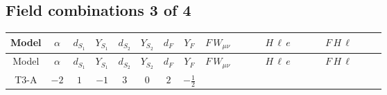 \documentclass[8pt]{article}
\begin{document}
\begin{landscape}
\subsection*{Field combinations 3 of 4}
\begin{longtable}{@{}cccccccc >{\raggedright\arraybackslash}p{0.21\linewidth} >{\raggedright\arraybackslash}p{0.21\linewidth} >{\raggedright\arraybackslash}p{0.21\linewidth}@{}}
\toprule
Model & $\alpha$ & $d_{S_1}$ & $Y_{S_1}$ & $d_{S_2}$ & $Y_{S_2}$ & $d_F$ & $Y_F$ & $F\,W_{\mu\nu}$ & $H\,\ell\,e$ & $F\,H\,\ell$ \\
\midrule
\endfirsthead
\toprule
Model & $\alpha$ & $d_{S_1}$ & $Y_{S_1}$ & $d_{S_2}$ & $Y_{S_2}$ & $d_F$ & $Y_F$ & $F\,W_{\mu\nu}$ & $H\,\ell\,e$ & $F\,H\,\ell$ \\
\midrule
\endhead
T3-A & $-2$ & $1$ & $-1$ & $3$ & $0$ & $2$ & $-\frac{1}{2}$ & \scriptsize\adjustbox{max width=\linewidth}{$\begin{gathered} -\frac{1}{2} \hbar  \log \left(\frac{\bar{\mu}^{2}}{M_F^2}\right) \left(W_{\mu _1\mu _2}^{A_1}\right){}^2\end{gathered}$} & \scriptsize\adjustbox{max width=\linewidth}{$\begin{gathered} +\frac{\hbar  \overline{y_{1,i_3,r_1}} \overline{L_{a_1,i_2}}\, P_R\, e_{i_1} H_{a_1} y_{1,i_2,r_1} Y_{e,i_3,i_1}}{4 \epsilon } \\ -\frac{1}{8} \hbar  \overline{y_{1,i_3,r_1}} \overline{L_{a_1,i_2}}\, P_R\, e_{i_1} H_{a_1} y_{1,i_2,r_1} Y_{e,i_3,i_1} \\ +\frac{\sqrt{3} \hbar  \overline{y_{2,i_3,r_1}} \overline{L_{a_1,i_2}}\, P_R\, e_{i_1} H_{a_1} y_{2,i_2,r_1} Y_{e,i_3,i_1}}{4 \epsilon }\end{gathered}$} & \scriptsize\adjustbox{max width=\linewidth}{$\begin{gathered} +\frac{2 \hbar  \log \left(\frac{M_F^2}{m_2^2}\right) \overline{y_{1,i_1,r_1}} \overline{y_{2,i_2,r_1}} L_{a_4,i_2}{}^T\, C\, P_L\, L_{a_2,i_1} H_{a_1} H_{a_3} m_2^2 \lambda_5 \epsilon_{a_1,a_2} \epsilon_{a_3,a_4} M_F^3}{\sqrt{3} \left(M_F^2-m_1^2\right) \left(M_F^2-m_2^2\right) \left(m_1^2-m_2^2\right)} \\ -\frac{2 \hbar  \log \left(\frac{M_F^2}{m_1^2}\right) \overline{y_{1,i_1,r_1}} \overline{y_{2,i_2,r_1}} L_{a_4,i_2}{}^T\, C\, P_L\, L_{a_2,i_1} H_{a_1} H_{a_3} m_1^2 \lambda_5 \epsilon_{a_1,a_2} \epsilon_{a_3,a_4} M_F^3}{\sqrt{3} \left(M_F^2-m_1^2\right) \left(M_F^2-m_2^2\right) \left(m_1^2-m_2^2\right)} \\ +\frac{2 \hbar  \log \left(\frac{M_F^2}{m_2^2}\right) \overline{\lambda_5} \overline{L_{a_3,i_1}}\, C\, P_R\, \overline{L_{a_4,i_2}}{}^T m_2^2 y_{1,i_1,r_1} y_{2,i_2,r_1} \epsilon_{a_1,a_3} \epsilon_{a_2,a_4} H_{a_1}{}^{\dagger } H_{a_2}{}^{\dagger } M_F^3}{\sqrt{3} \left(M_F^2-m_1^2\right) \left(M_F^2-m_2^2\right) \left(m_1^2-m_2^2\right)}\end{gathered}$} \\

\end{longtable}
\end{landscape}
\end{document}
